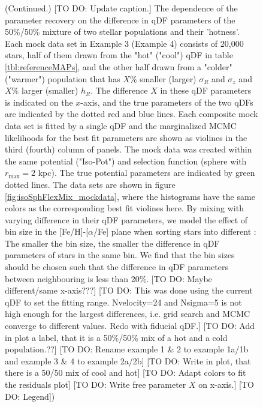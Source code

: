 \addtocounter{figure}{-1}
\begin{figure} [t!]
  \caption{(Continued.)  [TO DO: Update caption.] The dependence of the parameter recovery on the difference in qDF parameters of the 50\%/50\% mixture of two stellar populations and their 'hotness'. Each mock data set in Example 3 (Example 4) consists of 20,000 stars, half of them drawn from the "hot" ("cool") qDF in table \ref{tbl:referenceMAPs}, and the other half drawn from a "colder" ("warmer") population that has $X\%$ smaller (larger) $\sigma_R$ and $\sigma_z$ and $X\%$ larger (smaller) $h_R$. The difference $X$ in these qDF parameters is indicated on the $x$-axis, and the true parameters of the two qDFs are indicated by the dotted red and blue lines. Each composite mock data set is fitted by a single qDF and the marginalized MCMC likelihoods for the best fit parameters are shown as violines in the third (fourth) column of panels. The mock data was created within the same potential ("Iso-Pot") and selection function (sphere with $r_\text{max} = 2$ kpc). The true potential parameters are indicated by green dotted lines. The data sets are shown in figure \ref{fig:isoSphFlexMix_mockdata}, where the histograms have the same colors as the corresponding best fit violines here. By mixing \MAPs with varying difference in their qDF parameters, we model the effect of bin size in the [Fe/H]-[$\alpha$/Fe] plane when sorting stars into different \MAPs: The smaller the bin size, the smaller the difference in qDF parameters of stars in the same bin. We find that the bin sizes should be chosen such that the difference in qDF parameters between neighbouring \MAPs is less than 20\%.
[TO DO: Maybe different/same x-axis???] [TO DO: This was done using the current qDF to set the fitting range. Nvelocity=24 and Nsigma=5 is not high enough for the largest differences, i.e. grid search and MCMC converge to different values. Redo with fiducial qDF.] [TO DO: Add in plot a label, that it is a 50\%/50\% mix of a hot and a cold population.??] [TO DO: Rename example 1 \& 2 to example 1a/1b and example 3 \& 4 to example 2a/2b] [TO DO: Write in plot, that there is a 50/50 mix of cool and hot] [TO DO: Adapt colors to fit the residuals plot] [TO DO: Write free parameter $X$ on x-axis.] [TO DO: Legend])} 
\end{figure}

